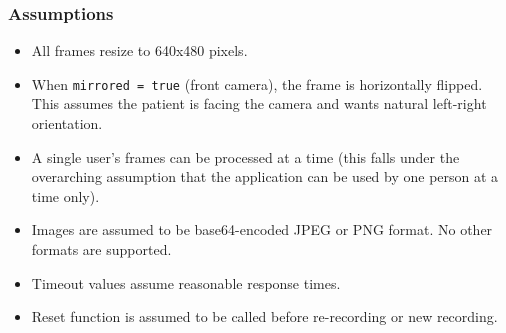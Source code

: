 \documentclass[12pt, titlepage]{article}
\begin{document}
\subsubsection{Assumptions}
\begin{itemize}
    \item All frames resize to 640x480 pixels.
    \item When \texttt{mirrored = true} (front camera), the frame is horizontally flipped. 
    This assumes the patient is facing the camera and wants natural left-right orientation.
    \item A single user's frames can be processed at a time (this falls under the overarching assumption that the
    application can be used by one person at a time only).
    \item Images are assumed to be base64-encoded JPEG or PNG format. No other formats are supported.
    \item Timeout values assume reasonable response times.
    \item Reset function is assumed to be called before re-recording or new recording.
\end{itemize}
\end{document}
